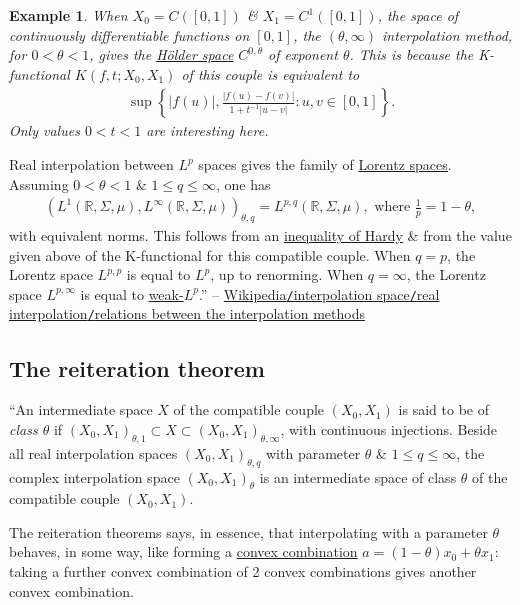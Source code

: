 \documentclass[oneside]{book}
\numberwithin{equation}{section}
\newtheorem{example}{Example}[chapter]
\begin{document}
\begin{example}
	When $X_0 = C([0,1])$ \& $X_1 = C^1([0,1])$, the space of continuously differentiable functions on $[0,1]$, the $(\theta,\infty)$ interpolation method, for $0 < \theta < 1$, gives the \href{https://en.wikipedia.org/wiki/H%C3%B6lder_condition}{H\"older space} $C^{0,\theta}$ of exponent $\theta$. This is because the K-functional $K(f,t;X_0,X_1)$ of this couple is equivalent to
	\begin{align*}
		\sup\left\{|f(u)|,\frac{|f(u) - f(v)|}{1 + t^{-1}|u - v|}:u,v\in[0,1]\right\}.
	\end{align*}
	Only values $0 < t < 1$ are interesting here.
\end{example}
Real interpolation between $L^p$ spaces gives the family of \href{https://en.wikipedia.org/wiki/Lorentz_space}{Lorentz spaces}. Assuming $0 < \theta < 1$ \& $1\le q\le\infty$, one has
\begin{align*}
	(L^1(\mathbb{R},\Sigma,\mu),L^\infty(\mathbb{R},\Sigma,\mu))_{\theta,q} = L^{p,q}(\mathbb{R},\Sigma,\mu),\mbox{ where }\frac{1}{p} = 1 - \theta,
\end{align*}
with equivalent norms. This follows from an \href{https://en.wikipedia.org/wiki/Hardy%27s_inequality}{inequality of Hardy} \& from the value given above of the K-functional for this compatible couple. When $q = p$, the Lorentz space $L^{p,p}$ is equal to $L^p$, up to renorming. When $q = \infty$, the Lorentz space $L^{p,\infty}$ is equal to \href{https://en.wikipedia.org/wiki/Lp_space#Weak_Lp}{weak-$L^p$}.'' -- \href{https://en.wikipedia.org/wiki/Interpolation_space#Relations_between_the_interpolation_methods}{Wikipedia\texttt{/}interpolation space\texttt{/}real interpolation\texttt{/}relations between the interpolation methods}

\subsection{The reiteration theorem}
``An intermediate space $X$ of the compatible couple $(X_0,X_1)$ is said to be of \textit{class $\theta$} if $(X_0,X_1)_{\theta,1}\subset X\subset(X_0,X_1)_{\theta,\infty}$, with continuous injections. Beside all real interpolation spaces $(X_0,X_1)_{\theta,q}$ with parameter $\theta$ \& $1\le q\le\infty$, the complex interpolation space $(X_0,X_1)_\theta$ is an intermediate space of class $\theta$ of the compatible couple $(X_0,X_1)$.

The reiteration theorems says, in essence, that interpolating with a parameter $\theta$ behaves, in some way, like forming a \href{https://en.wikipedia.org/wiki/Convex_combination}{convex combination} $a = (1 - \theta)x_0 + \theta x_1$: taking a further convex combination of 2 convex combinations gives another convex combination.
\end{document}

